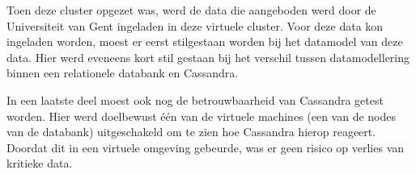 Toen deze cluster opgezet was, werd de data die aangeboden werd door de Universiteit van Gent ingeladen in deze virtuele cluster.
Voor deze data kon ingeladen worden, moest er eerst stilgestaan worden bij het datamodel van deze data.
Hier werd eveneens kort stil gestaan bij het verschil tussen datamodellering binnen een relationele databank en Cassandra. 

In een laatste deel moest ook nog de betrouwbaarheid van Cassandra getest worden.
Hier werd doelbewust één van de virtuele machines (een van de nodes van de databank) uitgeschakeld om te zien hoe Cassandra hierop reageert.
Doordat dit in een virtuele omgeving gebeurde, was er geen risico op verlies van kritieke data.